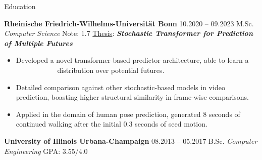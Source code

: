 \begin{rubric}{Education}


\entry*[]  \textbf{Rheinische Friedrich-Wilhelms-Universität Bonn} \hfill  10.2020 -- 09.2023   \newline
 M.Sc. \emph{Computer Science}  \hfill Note:  1.7 \newline
 \underline{Thesis}:  \hspace*{5mm} \textit{\textbf{Stochastic Transformer for Prediction of Multiple Futures}} \newline 
 \vspace{\CVItemizeHeaderSpacing} \begin{itemize}[rightmargin=1cm]
 	\setlength{\itemsep}{\CVItemizeSpacing}
 	\item Developed a novel transformer-based predictor architecture, able to learn a ~~~~~~~~~~~ distribution over potential futures.  
 	\item Detailed comparison against other stochastic-based models in video prediction, boasting higher structural similarity in frame-wise comparisons.
 	\item Applied in the domain of human pose prediction, generated 8 seconds of continued walking after the initial 0.3 seconds of seed motion.
 \end{itemize}
\entry*[]  \textbf{University of Illinois Urbana-Champaign} \hfill  08.2013 -- 05.2017 \newline
B.Sc. \emph{Computer Engineering} \hfill GPA: 3.55/4.0 \newline %



\end{rubric}
